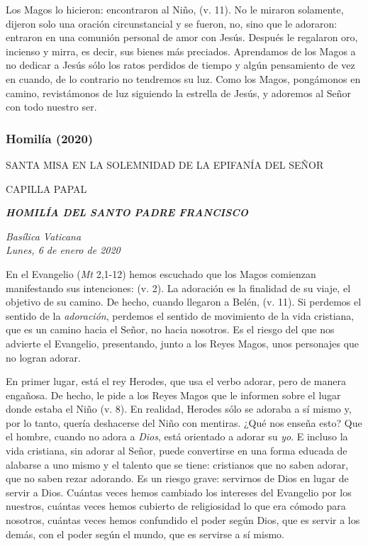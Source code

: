 \begin{body}
\begin{body}
{Los Magos lo hicieron: encontraron al Niño,  (v. 11). No le miraron solamente, dijeron solo una oración circunstancial y se fueron, no, sino que le adoraron: entraron en una comunión personal de amor con Jesús. Después le regalaron oro, incienso y mirra, es decir, sus bienes más preciados. Aprendamos de los Magos a no dedicar a Jesús sólo los ratos perdidos de tiempo y algún pensamiento de vez en cuando, de lo contrario no tendremos su luz. Como los Magos, pongámonos en camino, revistámonos de luz siguiendo la estrella de Jesús, y adoremos al Señor con todo nuestro ser.

\subsubsection{Homilía (2020)} {SANTA MISA EN LA SOLEMNIDAD DE LA EPIFANÍA DEL SEÑOR}

CAPILLA PAPAL

\textbf{\emph{HOMILÍA DEL SANTO PADRE FRANCISCO}}

\emph{Basílica Vaticana\\ Lunes, 6 de enero de 2020}



En el Evangelio (\emph{Mt} 2,1-12) hemos escuchado que los Magos comienzan manifestando sus intenciones:  (v. 2). La adoración es la finalidad de su viaje, el objetivo de su camino. De hecho, cuando llegaron a Belén,  (v. 11). Si perdemos el sentido de la \emph{adoración}, perdemos el sentido de movimiento de la vida cristiana, que es un camino hacia el Señor, no hacia nosotros. Es el riesgo del que nos advierte el Evangelio, presentando, junto a los Reyes Magos, unos personajes que no logran adorar.

En primer lugar, está el rey Herodes, que usa el verbo adorar, pero de manera engañosa. De hecho, le pide a los Reyes Magos que le informen sobre el lugar donde estaba el Niño  (v. 8). En realidad, Herodes sólo se adoraba a sí mismo y, por lo tanto, quería deshacerse del Niño con mentiras. ¿Qué nos enseña esto? Que el hombre, cuando no adora a \emph{Dios}, está orientado a adorar su \emph{yo}. E incluso la vida cristiana, sin adorar al Señor, puede convertirse en una forma educada de alabarse a uno mismo y el talento que se tiene: cristianos que no saben adorar, que no saben rezar adorando. Es un riesgo grave: servirnos de Dios en lugar de servir a Dios. Cuántas veces hemos cambiado los intereses del Evangelio por los nuestros, cuántas veces hemos cubierto de religiosidad lo que era cómodo para nosotros, cuántas veces hemos confundido el poder según Dios, que es servir a los demás, con el poder según el mundo, que es servirse a sí mismo.

}
\end{body}
\end{body}
